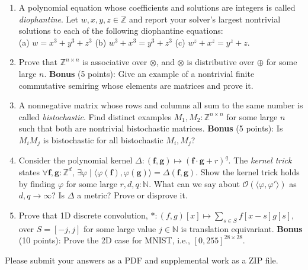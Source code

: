 \documentclass[11pt]{article}
\begin{document}
    \begin{enumerate}
        \item A polynomial equation whose coefficients and solutions are integers is called \textit{diophantine}. Let $w, x, y, z \in \mathbb{Z}$ and report your solver's largest nontrivial solutions to each of the following diophantine equations:\\ (a) $w = x^3+y^3+z^3$ (b) $w^3 + x^3 = y^3+z^3$ (c) $w^z + x^z = y^z + z$.
        \item Prove that $\mathbb{Z}^{n\times n}$ is associative over $\otimes$, and $\otimes$ is distributive over $\oplus$ for some large $n$. \textbf{Bonus} (5 points): Give an example of a nontrivial finite commutative semiring whose elements are matrices and prove it.
        \item A nonnegative matrix whose rows and columns all sum to the same number is called \textit{bistochastic}. Find distinct examples $M_1, M_2: \mathbb{Z}^{n\times n}$ for some large $n$ such that both are nontrivial bistochastic matrices. \textbf{Bonus} (5 points): Is $M_i M_j$ is bistochastic for all bistochastic $M_i, M_j$?
        \item Consider the polynomial kernel $\Delta: (\mathbf{f}, \mathbf{g})\mapsto (\mathbf{f}\cdot\mathbf{g} + r)^q$. The \textit{kernel trick} states $\forall \mathbf{f}, \mathbf{g}: \mathbb{Z}^d$, $\exists \varphi \mid \langle\varphi(\mathbf{f}), \varphi(\mathbf{g})\rangle = \Delta(\mathbf{f}, \mathbf{g})$. Show the kernel trick holds by finding $\varphi$ for some large $r, d, q: \mathbb{N}$. What can we say about $\mathcal O(\langle\varphi, \varphi'\rangle)$ as $d, q \rightarrow \infty$? Is $\Delta$ a metric? Prove or disprove it.
        \item Prove that 1D discrete convolution, $*: (f, g)[x] \mapsto \sum_{s \in S}f[x-s]g[s]$, over $S=[-j, j]$ for some large value $j \in \mathbb{N}$ is translation equivariant. \textbf{Bonus} (10 points): Prove the 2D case for MNIST, i.e., $[0, 255]^{28\times 28}$.
    \end{enumerate}

    \noindent Please submit your answers as a PDF and supplemental work as a ZIP file.
\end{document}

